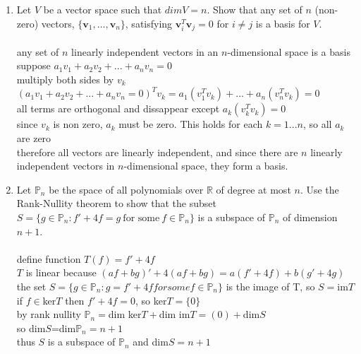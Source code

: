 \documentclass{article}
\begin{document}
{{\begin{enumerate}
\\so $B=\left[\begin{array}{cc}a & b\\c & d\end{array}\right]=\left[\begin{array}{cc}a & b\\0 & a+b\end{array}\right]$
\\this shows that $C$ is a subspace since it contains zero and is closed under addition and scalar multiplication since $a$ and $b$ vary freely.
\\it is 2 dimensional, so a convenient basis is $\{\left[\begin{array}{cc}1 & 0\\0 & 1\end{array}\right],\left[\begin{array}{cc}0 & 1\\0 & 1\end{array}\right]\}$

\newpage\item Let $V$ be a vector space such that $dimV=n$. Show that any set of $n$ (non-zero) vectors, $\{{\bm v}_1,\dots,{\bm v}_n\}$, satisfying ${\bm v}_i^T{\bm v}_j=0$ for $i\neq j$ is a basis for $V$.
\\
\\any set of $n$ linearly independent vectors in an $n$-dimensional space is a basis
\\suppose $a_1v_1+a_2v_2+...+a_nv_n=0$
\\multiply both sides by $v_k$
\\$(a_1v_1+a_2v_2+...+a_nv_n=0)^Tv_k=a_1(v_1^Tv_k)+...+a_n(v_n^Tv_k)=0$
\\all terms are orthogonal and dissappear except $a_k(v_k^Tv_k)=0$
\\since $v_k$ is non zero, $a_k$ must be zero. This holds for each $k=1...n$, so all $a_k$ are zero
\\therefore all vectors are linearly independent, and since there are $n$ linearly independent vectors in $n$-dimensional space, they form a basis.

\newpage\item  Let $\mathbb{P}_n$ be the space of all polynomials over $\mathbb{R}$ of degree at most $n$. Use the Rank-Nullity theorem to show that the subset $S=\{g\in \mathbb{P}_n: f'+4f=g~\textrm{for some}~f\in \mathbb{P}_n\}$ is a subspace of $\mathbb{P}_n$ of dimension $n+1$.
\\
\\define function $T(f)=f'+4f$
\\$T$ is linear because $(af+bg)'+4(af+bg)=a(f'+4f)+b(g'+4g)$
\\the set $S=\{g\in\mathbb{P}_n:g=f'+4f for some f\in\mathbb{P}_n\}$ is the image of T, so $S=$im$T$
\\if $f\in$ker$T$ then $f'+4f=0$, so ker$T=\{0\}$
\\by rank nullity $\mathbb{P}_n=$dim ker$T+$dim im$T=(0)+$dim$S$
\\ so dim$S$=dim$\mathbb{P}_n=n+1$
\\thus $S$ is a subspace of $\mathbb{P}_n$ and dim$S=n+1$


\end{enumerate}}}
\end{document}
